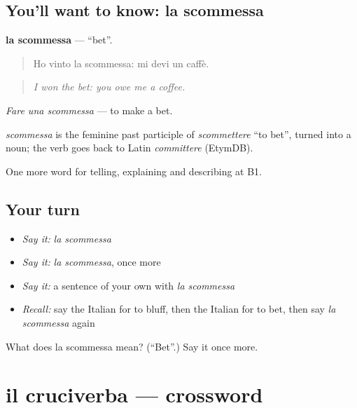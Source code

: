 \subsection*{You'll want to know: la scommessa}
\textbf{la scommessa} — \textquotedblleft{}bet\textquotedblright{}.

\begin{quote}
Ho vinto la scommessa: mi devi un caffè.
\end{quote}

\begin{quote}
\emph{I won the bet: you owe me a coffee.}
\end{quote}

\emph{Fare una scommessa} — to make a bet.

\begin{cousinweb}
\emph{scommessa} is the feminine past participle of \emph{scommettere} \textquotedblleft{}to bet\textquotedblright{}, turned into a noun; the verb goes back to Latin \emph{committere} (EtymDB).
\end{cousinweb}

\begin{grammarlens}[title={What you've built}]
One more word for telling, explaining and describing at B1.
\end{grammarlens}

\subsection*{Your turn}
\begin{itemize}
\raggedright
  \item \emph{Say it:} \emph{la scommessa}
  \item \emph{Say it:} \emph{la scommessa}, once more
  \item \emph{Say it:} a sentence of your own with \emph{la scommessa}
  \item \emph{Recall:} say the Italian for to bluff, then the Italian for to bet, then say \emph{la scommessa} again
\end{itemize}

\begin{tcolorbox}[breakable,colback=teal!4,colframe=teal!35!black,title={Before you move on}]
What does la scommessa mean? (\textquotedblleft{}Bet\textquotedblright{}.) Say it once more.
\end{tcolorbox}
\section[il cruciverba]{il cruciverba — crossword}

